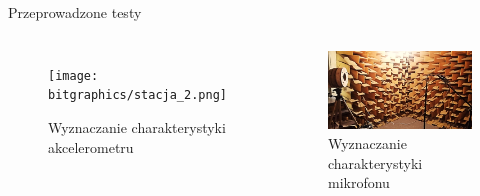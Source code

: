 \documentclass[aspectratio=1610,polish]{beamer} %
\begin{document}
  \begin{frame}{Przeprowadzone testy}
    \begin{columns}
      \begin{figure}
        \texttt{[image: bitgraphics/stacja\_2.png]}
        \caption{Wyznaczanie charakterystyki akcelerometru}
      \end{figure}
      \begin{figure}
        \includegraphics[width=\textwidth]{bitgraphics/komora.png}
        \caption{Wyznaczanie charakterystyki mikrofonu}
      \end{figure}
    \end{columns}
  \end{frame}
\end{document}
